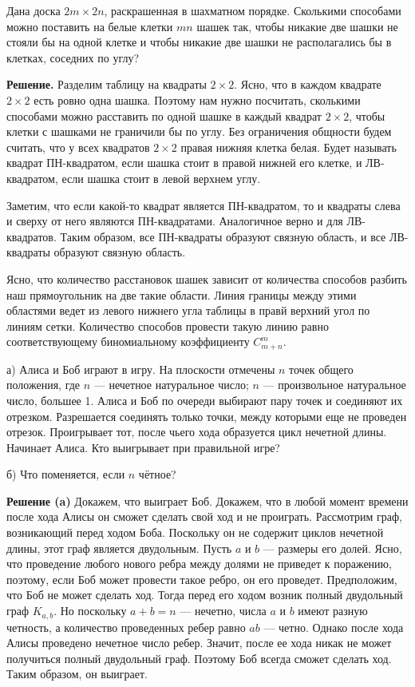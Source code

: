 Дана доска $2m\times 2n$, раскрашенная в шахматном порядке. Сколькими
способами можно поставить на белые клетки $mn$ шашек так, чтобы никакие
две шашки не стояли бы на одной клетке и чтобы никакие две шашки не
располагались бы в клетках, соседних по углу?

\textbf{Решение.}
Разделим таблицу на квадраты $2\times 2$. Ясно, что в каждом квадрате
$2\times 2$ есть ровно одна шашка. Поэтому нам нужно посчитать,
сколькими способами можно расставить по одной шашке в каждый квадрат
$2\times 2$, чтобы клетки с шашками не граничили бы по углу. Без
ограничения общности будем считать, что у всех квадратов $2\times 2$
правая нижняя клетка белая. Будет называть квадрат ПН-квадратом, если
шашка стоит в правой нижней его клетке, и ЛВ-квадратом, если шашка стоит
в левой верхнем углу.

Заметим, что если какой-то квадрат является ПН-квадратом, то и квадраты
слева и сверху от него являются ПН-квадратами. Аналогичное верно и для
ЛВ-квадратов. Таким образом, все ПН-квадраты образуют связную область, и
все ЛВ-квадраты образуют связную область.

Ясно, что количество расстановок шашек зависит от количества способов
разбить наш прямоугольник на две такие области. Линия границы между
этими областями ведет из левого нижнего угла таблицы в правй верхний
угол по линиям сетки. Количество способов провести такую линию равно
соответствующему биномиальному коэффициенту $C_{m+n}^m$.


а) Алиса и Боб играют в игру. На плоскости отмечены $n$ точек общего
положения, где $n$ — нечетное натуральное число; $n$ — произвольное
натуральное число, большее 1. Алиса и Боб по очереди выбирают пару точек
и соединяют их отрезком. Разрешается соединять только точки, между
которыми еще не проведен отрезок. Проигрывает тот, после чьего хода
образуется цикл нечетной длины. Начинает Алиса. Кто выигрывает при
правильной игре?

б) Что поменяется, если $n$ чётное?

\textbf{Решение (a)}
Докажем, что выиграет Боб. Докажем, что в любой момент времени после
хода Алисы он сможет сделать свой ход и не проиграть. Рассмотрим граф,
возникающий перед ходом Боба. Поскольку он не содержит циклов нечетной
длины, этот граф является двудольным. Пусть $a$ и $b$ — размеры его
долей. Ясно, что проведение любого нового ребра между долями не приведет
к поражению, поэтому, если Боб может провести такое ребро, он его
проведет. Предположим, что Боб не может сделать ход. Тогда перед его
ходом возник полный двудольный граф $K_{a,b}$. Но поскольку $a+b=n$ —
нечетно, числа $a$ и $b$ имеют разную четность, а количество проведенных
ребер равно $ab$ — четно. Однако после хода Алисы проведено нечетное
число ребер. Значит, после ее хода никак не может получиться полный
двудольный граф. Поэтому Боб всегда сможет сделать ход. Таким образом,
он выиграет.

